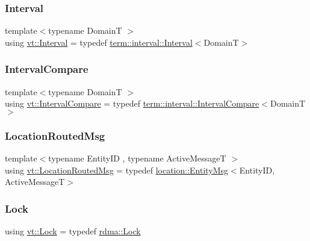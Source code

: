 \mbox{\label{namespacevt_a0036b5cb523aef3477d6d5de9d94eabb}} 
\subsubsection{\texorpdfstring{Interval}{Interval}}
{\footnotesize\ttfamily template$<$typename DomainT $>$ \\
using \hyperlink{namespacevt_a0036b5cb523aef3477d6d5de9d94eabb}{vt\+::\+Interval} = typedef \hyperlink{structvt_1_1term_1_1interval_1_1_interval}{term\+::interval\+::\+Interval}$<$DomainT$>$}

\mbox{\label{namespacevt_ab51b754f1d22841f555246195fab9d41}} 
\subsubsection{\texorpdfstring{Interval\+Compare}{IntervalCompare}}
{\footnotesize\ttfamily template$<$typename DomainT $>$ \\
using \hyperlink{namespacevt_ab51b754f1d22841f555246195fab9d41}{vt\+::\+Interval\+Compare} = typedef \hyperlink{structvt_1_1term_1_1interval_1_1_interval_compare}{term\+::interval\+::\+Interval\+Compare}$<$DomainT$>$}

\mbox{\label{namespacevt_a0cb65f2151629893480ef391def4e733}} 
\subsubsection{\texorpdfstring{Location\+Routed\+Msg}{LocationRoutedMsg}}
{\footnotesize\ttfamily template$<$typename Entity\+ID , typename Active\+MessageT $>$ \\
using \hyperlink{namespacevt_a0cb65f2151629893480ef391def4e733}{vt\+::\+Location\+Routed\+Msg} = typedef \hyperlink{structvt_1_1location_1_1_entity_msg}{location\+::\+Entity\+Msg}$<$Entity\+ID, Active\+MessageT$>$}

\mbox{\label{namespacevt_ae3eb725d1ffe20cd7d82a8c42f3e52ef}} 
\subsubsection{\texorpdfstring{Lock}{Lock}}
{\footnotesize\ttfamily using \hyperlink{namespacevt_1_1rdma_ac5c20b41a653e520b6305d4d454ecb70}{vt\+::\+Lock} = typedef \hyperlink{namespacevt_1_1rdma_ac5c20b41a653e520b6305d4d454ecb70}{rdma\+::\+Lock}}


